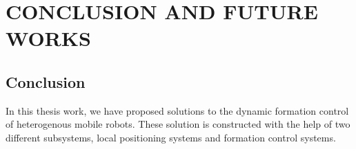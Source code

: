 

\chapter{CONCLUSION AND FUTURE WORKS}
\label{chp:conclusion}








	
\section{Conclusion}
In this thesis work, we have proposed solutions to the dynamic formation control of heterogenous mobile robots. These solution is constructed with the help of two different subsystems, local positioning systems and formation control systems. 

